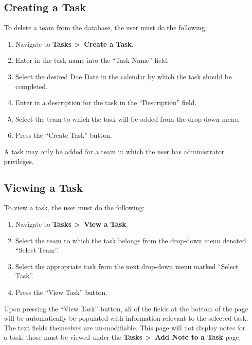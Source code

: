 \documentclass[12pt]{article}
\begin{document}
\subsection{Creating a Task}
To delete a team from the database, the user must do the following:
\begin{enumerate}
  \item Navigate to \textbf{Tasks \textgreater~Create a Task}.
  \item Enter in the task name into the ``Task Name'' field.
  \item Select the desired Due Date in the calendar by which the task should be completed.
  \item Enter in a description for the task in the ``Description'' field.
  \item Select the team to which the task will be added from the drop-down menu.
  \item Press the ``Create Task'' button.
\end{enumerate}
A task may only be added for a team in which the user has administrator privileges.
\subsection{Viewing a Task}
To view a task, the user must do the following:
\begin{enumerate}
  \item Navigate to \textbf{Tasks \textgreater~View a Task}.
  \item Select the team to which the task belongs from the drop-down menu denoted ``Select Team''.
  \item Select the appropriate task from the next drop-down menu marked ``Select Task''.
  \item Press the ``View Task'' button.
\end{enumerate}
Upon pressing the ``View Task'' button, all of the fields at the bottom of the page will be automatically be populated with information relevant to the selected task.  The text fields themselves are un-modifiable.  This page will not display notes for a task; those must be viewed under the \textbf{Tasks \textgreater~Add Note to a Task} page.
\end{document}
